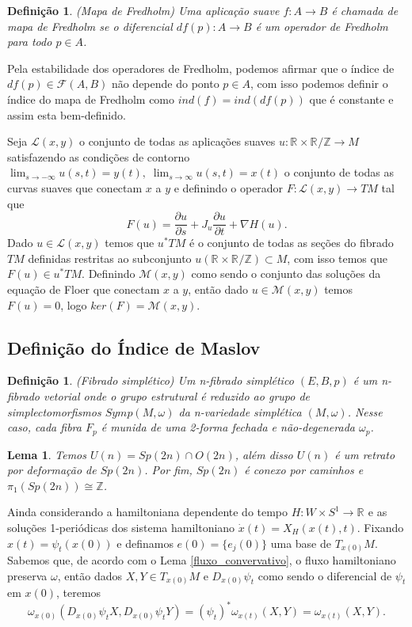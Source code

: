 \documentclass[12pt]{book}
\newtheorem{lema}[teorema]{Lema}
\newtheorem{definicao}[teorema]{Definição}
\newcommand{\dparcial}[2]{\frac{\partial #1}{\partial #2}}
\newcommand{\espacomoduli}[2]{\mathcal{M}(#1, #2)}
\newcommand{\operadoresfredholm}[2]{\mathcal{F}(#1, #2)}
\newcommand{\cartesianorealporcirculo}{\real{} \times \real{}/\mathbb{Z}}
\newcommand{\real}[1]{\mathbb{R}^{#1}}
\newcommand{\vermelho}[1]{{\color{red}#1}}
\begin{document}
	\begin{definicao}
		(Mapa de Fredholm) Uma aplicação suave $f: A \to B$ é chamada de mapa de Fredholm se o diferencial $df(p): A \to B$ é um operador de Fredholm para todo $p \in A$.
	\end{definicao}
	
	
	Pela estabilidade dos operadores de Fredholm, podemos afirmar que o índice de $df(p) \in \operadoresfredholm{A}{B}$ não depende do ponto $p \in A$, com isso podemos definir o índice do mapa de Fredholm como $ind(f)=ind(df(p))$ que é constante e assim esta bem-definido.
	
	Seja $\mathcal{L}(x,y)$ o conjunto de todas as aplicações suaves $u:\real{}\times \real{}/\mathbb{Z} \to M$ satisfazendo as condições de contorno $\lim_{s\to -\infty} u(s,t) = y(t), \; 	\lim_{s\to \infty} u(s,t) = x(t)$ o conjunto de todas as curvas suaves que conectam $x$ a $y$ e definindo o operador $F:\mathcal{L}(x,y) \to TM$ tal que 
	$$
	F(u) = \dparcial{u}{s} + J_{u}\dparcial{u}{t}+ \nabla H(u).
	$$
	Dado $u \in \mathcal{L}(x,y)$ temos que $u^{*}TM$ \vermelho{é o conjunto de todas as seções do fibrado $TM$ definidas restritas ao subconjunto $u(\cartesianorealporcirculo) \subset M$}, com isso temos que $F(u) \in u^{*}TM$. Definindo $\espacomoduli{x}{y}$ como sendo o conjunto das soluções da equação de Floer que conectam $x$ a $y$, então dado $u \in \espacomoduli{x}{y}$ temos $F(u) = 0$, logo $ker(F) = \espacomoduli{x}{y}$.
	
	
	\subsection{Definição do Índice de Maslov}
	
	\begin{definicao}
		(Fibrado simplético) Um n-fibrado simplético $(E,B, p)$ é um n-fibrado vetorial onde o grupo estrutural é reduzido ao grupo de simplectomorfismos $Symp(M,\omega)$ da n-variedade simplética $(M,\omega)$. Nesse caso, cada fibra $F_{p}$ é munida de uma 2-forma fechada e não-degenerada $\omega_{p}$.
	\end{definicao}
	
	\begin{lema}\label{Sp2n_homotopia}
		Temos $U(n) = Sp(2n)\cap O(2n)$, além disso $U(n)$ é um retrato por deformação de $Sp(2n)$. Por fim, $Sp(2n)$ é conexo por caminhos e $\pi_{1}(Sp(2n)) \cong \mathbb{Z}$.
	\end{lema}
	
	Ainda considerando a hamiltoniana dependente do tempo $H:W \times S^{1} \to \real{}$ e as soluções 1-periódicas dos sistema hamiltoniano $\dot{x}(t) = X_{H}(x(t), t)$. Fixando $x(t) = \psi_{t}(x(0))$ e definamos $e(0) = \{e_{j}(0)\}$ uma base de $T_{x(0)}M$. Sabemos que, de acordo com o Lema \ref{fluxo_convervativo}, o fluxo hamiltoniano preserva $\omega$, então dados $X,Y \in T_{x(0)}M$ e $D_{x(0)}\psi_{t}$ como sendo o diferencial de $\psi_{t}$ em $x(0)$, teremos
	$$
	\omega_{x(0)}(D_{x(0)}\psi_{t}X, D_{x(0)}\psi_{t}Y)=(\psi_{t})^{*}\omega_{x(t)}(X,Y) = \omega_{x(t)}(X,Y).
	$$
	
\end{document}
